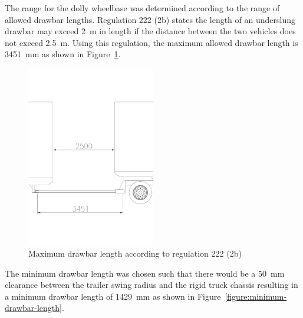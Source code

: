 The range for the dolly wheelbase was determined according to the range of allowed drawbar lengths. Regulation 222 (2b) states the length of an underslung drawbar may exceed 2~m in length if the distance between the two vehicles does not exceed 2.5~m. Using this regulation, the maximum allowed drawbar length is 3451~mm as shown in Figure~\ref{figure:maximum-drawbar-length-according-to-regulation-222-2b}.

\begin{figure}[H]
	\centering
	\includegraphics[width=0.5\textwidth]{fig/baseline-pintle-hitch-maximum-length}
	\caption{Maximum drawbar length according to regulation 222 (2b)}
	\label{figure:maximum-drawbar-length-according-to-regulation-222-2b}
\end{figure}

The minimum drawbar length was chosen such that there would be a 50~mm clearance between the trailer swing radius and the rigid truck chassis resulting in a minimum drawbar length of 1429~mm as shown in Figure~\ref{figure:minimum-drawbar-length}.

